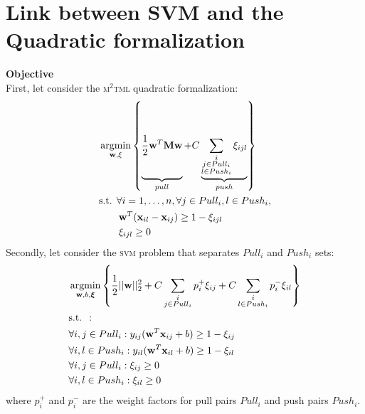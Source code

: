 \chapter{Link between SVM and the Quadratic formalization}
\label{chap:app:svm_link}

\noindent \textbf{Objective} \\
First, let consider the \textsc{m$^2$tml} quadratic formalization:
\begin{equation}
\begin{aligned}
&\displaystyle 		\argmin_{\textbf{w},\xi}
\left\lbrace \underbrace{
	\vphantom{ \sum\limits_{\substack{i \\ j \in Pull_i \\ l \in Push_i}} }
	\frac{1}{2} \textbf{w}^T \textbf{M} \textbf{w}		
	}_{pull}				
	+					
	C
	\underbrace{
		\sum\limits_{\substack{i \\ j \in Pull_i \\ l \in Push_i}}  \xi_{ijl}
		}_{push}
		\right\rbrace  \\
		&\text{s.t.  } \forall i = 1, \ldots, n, \forall j \in Pull_i, l \in Push_i, \\
		& \qquad \textbf{w}^T(\textbf{x}_{il}-\textbf{x}_{ij}) \geq 1-\xi_{ijl} \\
		& \qquad \xi_{ijl} \geq 0 
		\end{aligned}
		\label{eq:quadratic_A}
		\end{equation}
Secondly, let consider the \textsc{svm} problem that separates $Pull_i$ and $Push_i$ sets:
\begin{equation}
\begin{aligned}
&\displaystyle \argmin_{\textbf{w},b,\boldsymbol{\xi}} 
\left\lbrace \frac{1}{2}||\textbf{w}||_2^2
+ C \sum\limits_{\substack{i \\j \in Pull_i}}p_i^+\xi_{ij}
+ C \sum\limits_{\substack{i \\l \in Push_i}}p_i^-\xi_{il} \right\rbrace \\
& \text{s.t.  }: \\
& \forall i,j \in Pull_i: y_{ij}(\textbf{w}^T\textbf{x}_{ij}+b) \geq 1-\xi_{ij}\\
& \forall i,l \in Push_i: y_{il}(\textbf{w}^T\textbf{x}_{il}+b) \geq 1-\xi_{il}\\
& \forall i,j \in Pull_i: \xi_{ij} \geq 0 \\
& \forall i,l \in Push_i: \xi_{il} \geq 0
\end{aligned}
\label{eq:SVMSofMarginProblem1_A}
\end{equation}
\noindent where $p_i^+$ and $p_i^-$ are the weight factors for pull pairs $Pull_i$ and push pairs $Push_i$. 


